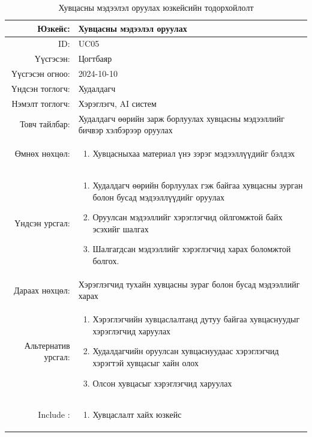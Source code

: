 \begin{longtable}{|r|p{11.5cm}|}
    \caption{Хувцасны мэдээлэл оруулах юзкейсийн тодорхойлолт} 
    \label{table:songolt3}\\ \hline
    {Юзкейс:} & {Хувцасны мэдээлэл оруулах}\\ \hline
    {ID:} & {UC05}\\ \hline
    {Үүсгэсэн:} & {Цогтбаяр}\\ \hline
    {Үүсгэсэн огноо:} & {2024-10-10}\\ \hline
    {Үндсэн тоглогч:} & {Худалдагч}\\ \hline
    {Нэмэлт тоглогч:} & {Хэрэглэгч, AI систем}\\ \hline
    {Товч тайлбар:} & {Худалдагч өөрийн зарж борлуулах хувцасны мэдээллийг бичвэр хэлбэрээр оруулах}\\ \hline
    {Өмнөх нөхцөл:} & {\begin{enumerate}
        \item Хувцасныхаа материал үнэ зэрэг мэдээллүүдийг бэлдэх
    \end{enumerate}}\\ \hline
    {Үндсэн урсгал:} & {\begin{enumerate}
        \item Худалдагч өөрийн борлуулах гэж байгаа хувцасны зурган болон бусад мэдээллүүдийг оруулах
    \item Оруулсан мэдээллийг хэрэглэгчид ойлгомжтой байх эсэхийг шалгах
    \item Шалгагдсан мэдээллийг хэрэглэгчид харах боломжтой болгох.\end{enumerate}}\\ \hline
    {Дараах нөхцөл:} & {Хэрэглэгчид тухайн хувцасны зураг болон бусад мэдээллийг харах}\\ \hline
    {Альтернатив урсгал:} & {\begin{enumerate}
        \item Хэрэглэгчийн хувцаслалтанд дутуу байгаа хувцаснуудыг хэрэглэгчид харуулах
        \item Худалдагчийн оруулсан хувцаснуудаас хэрэглэгчид хэрэгтэй хувцасыг хайн олох
        \item Олсон хувцасыг хэрэглэгчид харуулах
    \end{enumerate}}\\ \hline
     {Include :} & {\begin{enumerate}
        \item Хувцаслалт хайх юзкейс
    \end{enumerate}}\\ \hline
\end{longtable}
